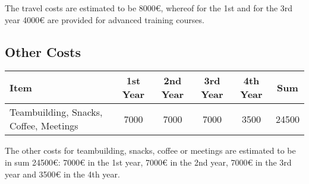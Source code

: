 The travel costs are estimated to be 8000\euro{}, whereof for the 1st and for the 3rd year 4000\euro{} are provided for advanced training courses.


\subsection{Other Costs}
\begin{tabular}{|l|c|c|c|c|c|}
\hline 
Item & 1st Year & 2nd Year & 3rd Year & 4th Year & Sum \\ 
\hline 
Teambuilding, Snacks, Coffee, Meetings & 7000 & 7000 & 7000 & 3500 & 24500 \\
\hline 
\end{tabular} 

The other costs for teambuilding, snacks, coffee or meetings are estimated to be in sum 24500\euro{}: 7000\euro{} in the 1st year, 7000\euro{} in the 2nd year, 7000\euro{} in the 3rd year and 3500\euro{} in the 4th year.
